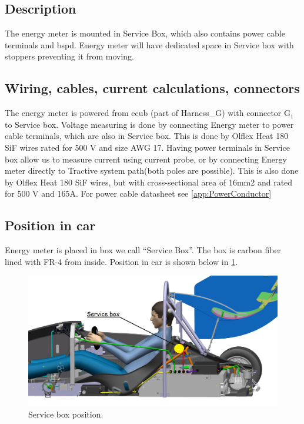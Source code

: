 \subsection{Description}

The energy meter is mounted in Service Box, which also contains power cable terminals and \gls{bspd}. Energy meter will have dedicated space in Service box with stoppers preventing it from moving. 

\subsection{Wiring, cables, current calculations, connectors}

The energy meter is powered from \gls{ecub} (part of Harness\_G) with connector G$_1$ to Service box. Voltage measuring is done by connecting Energy meter to power cable terminals, which are also in Service box. This is done by Olflex Heat 180 SiF wires rated for 500 V and size AWG 17. Having power terminals in Service box allow us to measure current using current probe, or by connecting Energy meter directly to Tractive system path(both poles are possible). This is also done by Olflex Heat 180 SiF wires, but with cross-sectional area of 16mm2 and rated for 500 V and 165A. For power cable datasheet see \ref{app:PowerConductor}

\subsection{Position in car}

Energy meter is placed in box we call “Service Box”. The box is carbon fiber lined with FR-4 from inside. Position in car is shown below in \ref{fig:ServiceBox-position}.

\begin{figure}[H]
	\centering
	\includegraphics[width=\textwidth]{./img/ServiceBox-position.jpg}
	\caption{Service box position.}
	\label{fig:ServiceBox-position}
\end{figure}





